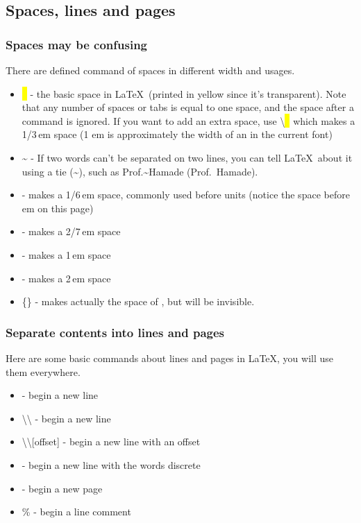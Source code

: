 \subsection{Spaces, lines and pages}

\begin{frame}
	\frametitle{Spaces may be confusing}
	There are defined command of spaces in different width and usages.
	\begin{itemize}
		\item \colorbox{yellow}{\ } - the basic space in \LaTeX\ (printed in yellow since it's transparent). Note that any number of spaces or tabs is equal to one space, and the space after a command is ignored. If you want to add an extra space, use \alert{\textbackslash}\colorbox{yellow}{\ } which makes a 1/3\,em space (1 em is approximately the width of an  in the current font)
		\item \~{} - If two words can't be separated on two lines, you can tell \LaTeX\ about it using a tie (\~{}), such as Prof.\~{}Hamade (Prof.~Hamade).
		\item  \samplecommand{,} - makes a 1/6\,em space, commonly used before units (notice the space before em on this page)
		\item  \samplecommand{;} - makes a 2/7\,em space
		\item  {} - makes a 1\,em space
		\item  {} - makes a 2\,em space
		\item  {}\{\} - makes actually the space of , but  will be invisible.
	\end{itemize}
\end{frame}

\begin{frame}
	\frametitle{Separate contents into lines and pages}
	Here are some basic commands about lines and pages in \LaTeX, you will use them everywhere.
	\begin{itemize}
		\item {} - begin a new line
		\item \alert{\textbackslash\textbackslash} - begin a new line
		\item \alert{\textbackslash\textbackslash[offset]} - begin a new line with an offset
		\item {} - begin a new line with the words discrete
		\item {} - begin a new page
		\item \alert{\%} - begin a line comment
	\end{itemize}
\end{frame}

